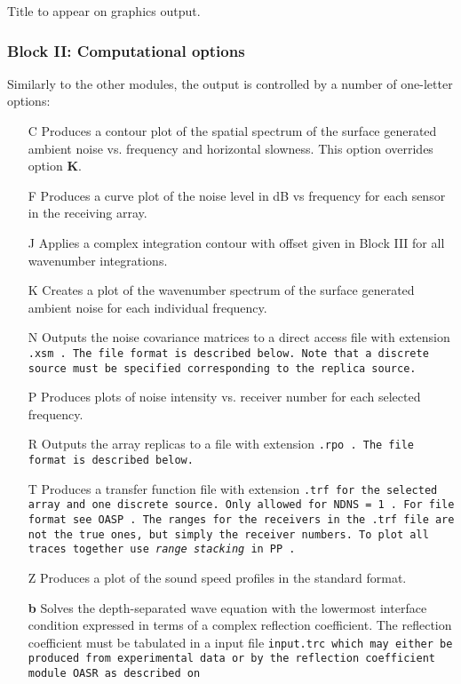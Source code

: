Title to appear on graphics output.

\subsubsection{Block II: Computational options}

Similarly to the other modules, the output is controlled by a number
of one-letter options:
\begin{itemize}
\item[C] Produces a contour plot of the spatial spectrum of the
surface generated ambient noise vs. frequency and horizontal slowness.
This
option overrides option {\bf K}.
\item[F] Produces a curve plot of the noise level in dB vs frequency for each
sensor in the receiving array.
\item[J] Applies a complex integration contour with offset given in
Block III for all wavenumber integrations.
\item[K] Creates a plot of the wavenumber spectrum of the surface
generated ambient noise for each individual frequency.
\item[N] Outputs the noise covariance matrices to a direct access
file with extension \tt .xsm \rm. The file format is described
below. Note that a discrete source must be specified corresponding to
the replica source.
\item[P] Produces plots of noise intensity vs. receiver number for
each selected frequency.
\item[R] Outputs the array replicas to a 
file with extension \tt .rpo \rm. The file format is described below.
\item[T] Produces a transfer function file with extension \tt .trf \rm 
for the selected array and 
one discrete source. Only allowed for \tt NDNS = 1 \rm. 
For file format see \tt OASP \rm. The ranges for the receivers in the 
\tt .trf \rm file are not the true ones, but simply the receiver numbers.
To plot all traces together use {\em range stacking} in \tt PP \rm.
\item[Z] Produces a plot of the sound speed profiles in the standard
format.
    \item[{\bf b}] Solves the depth-separated wave equation with the
lowermost  interface condition expressed in terms of a complex
reflection coefficient. The reflection coefficient must be tabulated in a input file \tt input.trc \rm
which may either be produced from experimental data or by the
reflection coefficient module OASR as described on

\end{itemize}

